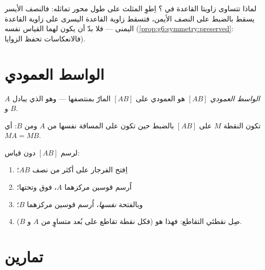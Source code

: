 \begin{example}\label{ex:g6:symmetry:proves}
لماذا تتساوى زاويتا القاعدة في ؟ اِطوِ
المثلث على طول محور تماثله: فالنصف الأيسر يسقط بالضبط على
النصف الأيمن، فتسقط زاوية القاعدة اليسرى على زاوية القاعدة اليمنى ---
فلا بدّ أن يكون لهما القياس نفسه
(\cref{prop:g6:symmetry:preserved}: فالانعكاسات تحفظ الزوايا).
\end{example}

\section{الواسط العمودي}

\begin{definition}\label{def:g6:symmetry:bisector}
\emph{الواسط العمودي}
 $[AB]$ هو  العمودي على $[AB]$ المارّ
بمنتصفها --- وهو  الذي يبادل $A$ و $B$.
\end{definition}

\begin{proposition}\label{prop:g6:symmetry:bisector}
تكون النقطة $M$ على   $[AB]$ بالضبط حين
تكون على المسافة نفسها من $A$ ومن $B$: أي $MA = MB$.
\end{proposition}
\admitted

\begin{method}\label{met:g6:symmetry:bisector}
لرسم   $[AB]$ دون قياس:
\begin{enumerate}
  \item اِفتح الفرجار على أكثر من نصف $AB$؛
  \item اُرسم قوسين مركزهما $A$، فوق  وتحتها؛
  \item وبالفتحة \emph{نفسها}، اُرسم قوسين مركزهما $B$؛
  \item صِل نقطتَي التقاطع: فهذا  هو  (فكل نقطة تقاطع على بُعد متساوٍ من $A$ و $B$).
\end{enumerate}
\end{method}

\section{تمارين}


